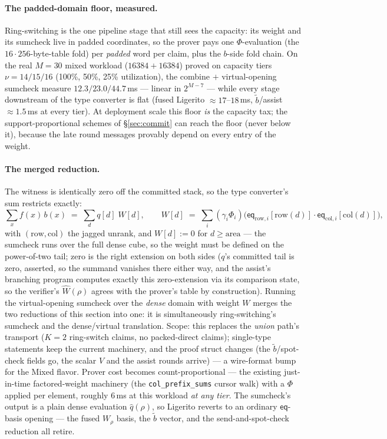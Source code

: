 \documentclass[11pt]{article}
\newcommand{\eq}{\mathsf{eq}}
\newcommand{\code}[1]{\texttt{#1}}
\theoremstyle{definition}
\begin{document}
\paragraph{The padded-domain floor, measured.} Ring-switching is the one
pipeline stage that still sees the capacity: its weight and its sumcheck
live in padded coordinates, so the prover pays one $\Phi$-evaluation
(the $16{\cdot}256$-byte-table fold) per \emph{padded} word per claim,
plus the $b$-side fold chain. On the real $M = 30$ mixed workload
($16384 + 16384$) proved on capacity tiers $\nu = 14/15/16$ (100\%,
50\%, 25\% utilization), the combine $+$ virtual-opening sumcheck
measure $12.3 / 23.0 / 44.7$\,ms --- linear in $2^{M-7}$ --- while
every stage downstream of the type converter is flat (fused Ligerito
$\approx 17$--$18$\,ms, $\tilde b$/assist $\approx 1.5$\,ms at every
tier). At deployment scale this floor \emph{is} the capacity tax; the
support-proportional schemes of \S\ref{sec:commit} can reach the floor
(never below it), because the late round messages provably depend on
every entry of the weight.

\paragraph{The merged reduction.} The witness is identically zero off
the committed stack, so the type converter's sum restricts exactly:
\[
  \sum_{x} f(x)\, b(x) \;=\; \sum_{d} q[d]\; W[d],
  \qquad
  W[d] \;=\; \sum_i (\gamma_i \Phi_i)\bigl(\eq_{\mathrm{row},i}[\mathrm{row}(d)]
  \cdot \eq_{\mathrm{col},i}[\mathrm{col}(d)]\bigr),
\]
with $(\mathrm{row}, \mathrm{col})$ the jagged unrank, and
$W[d] := 0$ for $d \ge \mathrm{area}$ --- the sumcheck runs over the
full dense cube, so the weight must be defined on the power-of-two
tail; zero is the right extension on both sides ($q$'s committed tail
is zero, asserted, so the summand vanishes there either way, and the
assist's branching program computes exactly this zero-extension via
its comparison state, so the verifier's $\widehat W(\rho)$ agrees with
the prover's table by construction). Running the
virtual-opening sumcheck over the \emph{dense} domain with weight $W$
merges the two reductions of this section into one: it is
simultaneously ring-switching's sumcheck and the dense/virtual
translation. Scope: this replaces the \emph{union} path's transport
($K = 2$ ring-switch claims, no packed-direct claims); single-type
statements keep the current machinery, and the proof struct changes
(the $\tilde b$/spot-check fields go, the scalar $V$ and the assist
rounds arrive) --- a wire-format bump for the Mixed flavor. Prover cost becomes count-proportional --- the existing
just-in-time factored-weight machinery (the \code{col\_prefix\_sums}
cursor walk) with a $\Phi$ applied per element, roughly $6$\,ms at this
workload \emph{at any tier}. The sumcheck's output is a plain dense
evaluation $\hat q(\rho)$, so Ligerito reverts to an ordinary
$\eq$-basis opening --- the fused $W_\rho$ basis, the $\tilde b$
vector, and the send-and-spot-check reduction all retire.
\end{document}

